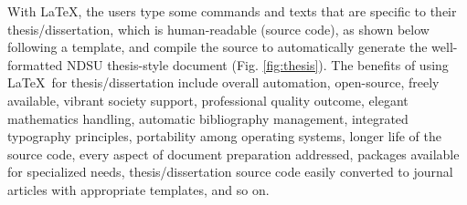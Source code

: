 \documentclass{article}
\begin{document}
With \LaTeX, the users type some commands and texts that are specific to their thesis/dissertation, which is human-readable (source code), as shown below following a template, and compile the source to automatically generate the well-formatted NDSU thesis-style document (Fig. \ref{fig:thesis}). The benefits of using \LaTeX\ for thesis/dissertation include overall automation, open-source, freely available, vibrant society support, professional quality outcome, elegant mathematics handling, automatic bibliography management, integrated typography principles, portability among operating systems, longer life of the source code, every aspect of document preparation addressed, packages available for specialized needs, thesis/dissertation source code easily converted to journal articles with appropriate templates, and so on.        
\end{document}
